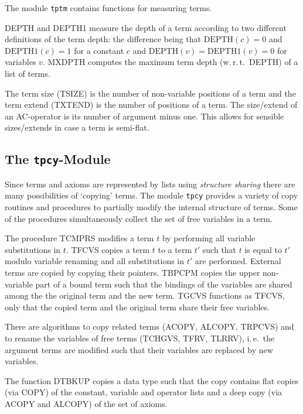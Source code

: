 The module {\tt tptm} contains functions for measuring terms.

DEPTH and DEPTH1 measure the depth of a term according to two different
definitions of the term depth:
the difference being that \( \mbox{DEPTH}(c) = 0 \) and 
\( \mbox{DEPTH1}(c) = 1 \) for a constant $c$ and
\( \mbox{DEPTH}(v) = \mbox{DEPTH1}(v) = 0\) for variables $v$.
MXDPTH computes the maximum term depth (w.\,r.\,t.\ DEPTH) of a list of terms.

The term size (TSIZE) is the number of non-variable positions of a term and
the term extend (TXTEND) is the number of positions of a term.
The size/extend of an AC-operator is its number of argument minus one.
This allows for sensible sizes/extends in case a term is 
semi-flat.

\subsection{The {\tt tpcy}-Module}

Since terms and axioms are represented by lists using {\em structure sharing}
there are many possibilities of `copying' terms.
The module {\tt tpcy} provides a variety of copy routines and procedures to
partially modify the internal structure of terms.
Some of the procedures simultaneously collect the set of free variables in a 
term.

The procedure TCMPRS modifies a term $t$ by performing all variable
substitutions in $t$.
TFCVS copies a term $t$ to a term $t'$ such that $t$ is equal to $t'$ modulo 
variable renaming and all substitutions in $t'$ are performed.
External terms are copied by copying their pointers.
TBPCPM copies the upper non-variable part of a bound term such that the 
bindings of the variables are shared among the the original term and the new 
term.
TGCVS functions as TFCVS, only that the copied term and the original
term share their free variables.

There are algorithms to copy related terms (ACOPY, ALCOPY, TRPCVS) and to rename the
variables of free terms (TCHGVS, TFRV, TLRRV), i.\,e.\ the
argument terms are modified such that their variables are replaced by new 
variables.

The function DTBKUP copies a data type such that the copy contains
flat copies (via COPY) of the constant, variable and operator lists and a deep
copy (via ACOPY and ALCOPY) of the set of axioms.

